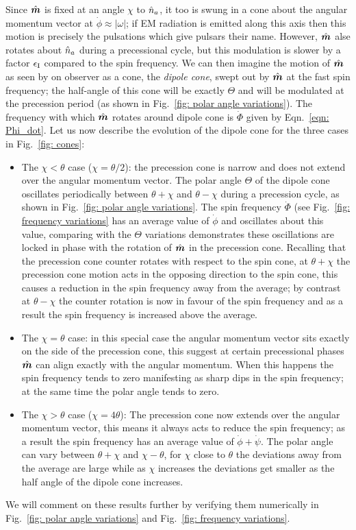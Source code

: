 \documentclass[../full_thesis/full_thesis.tex]{subfiles}
\begin{document}
Since $\hat{\boldsymbol{m}}$ is fixed at an angle $\chi$ to $\hat{n}_a$, it too is swung in a cone
about the angular momentum vector at $\dot{\phi}\approx |\omega|$; if EM
radiation is emitted along this axis then this motion is precisely the
pulsations which give pulsars their name.  However, $\hat{\boldsymbol{m}}$ alse rotates about
$\hat{n}_a$ during a precessional cycle, but this modulation is slower by a factor
$\epsilon_{\mathrm{I}}$ compared to the spin frequency. We can then imagine the motion of $\hat{\boldsymbol{m}}$
as seen by on observer as a cone, the \emph{dipole cone}, swept out by $\hat{\boldsymbol{m}}$ at
the fast spin frequency; the half-angle of this cone will be exactly $\Theta$
and will be modulated at the precession period (as shown in Fig.~\ref{fig:
polar angle variations}).  The frequency with which $\hat{\boldsymbol{m}}$ rotates around dipole
cone is $\dot{\Phi}$ given by Eqn.~\eqref{eqn: Phi_dot}. Let us now describe
the evolution of the dipole cone for the three cases in Fig.~\ref{fig: cones}:
\begin{itemize}
\item The $\chi < \theta$ case ($\chi = \theta/2$): the precession cone is
narrow and does not extend over the angular momentum vector. The polar angle
$\Theta$ of the dipole cone oscillates periodically between $\theta+\chi$ and
$\theta-\chi$ during a precession cycle, as shown in Fig.~\ref{fig: polar angle
variations}.  The spin frequency $\dot{\Phi}$ (see Fig.~\ref{fig: frequency
variations} has an average value of $\dot{\phi}$ and oscillates about this
value, comparing with the $\Theta$ variations demonstrates these oscillations
are locked in phase with the rotation of $\hat{\boldsymbol{m}}$ in the precession cone. Recalling
that the precession cone counter rotates with respect to the spin cone, at
$\theta+\chi$ the precession cone motion acts in the opposing direction to the
spin cone, this causes a reduction in the spin frequency away from the average;
by contrast at $\theta-\chi$ the counter rotation is now in favour of the spin
frequency and as a result the spin frequency is increased above the average.

\item The $\chi = \theta$ case: in this special case the angular momentum vector sits exactly
on the side of the precession cone, this suggest at certain precessional phases $\hat{\boldsymbol{m}}$ can align exactly with
the angular momentum. When this happens the spin frequency tends to zero manifesting as sharp dips in the
spin frequency; at the same time the polar angle tends to zero.

\item The $\chi > \theta$ case ($\chi = 4\theta$): The precession cone now extends over the
angular momentum vector, this means it always acts to reduce the spin
frequency; as a result the spin frequency has an average value of
$\dot{\phi} + \dot{\psi}$. The polar angle can vary between $\theta+\chi$ and
$\chi-\theta$, for $\chi$ close to $\theta$ the deviations away from the
average are large while as $\chi$ increases the deviations get smaller as
the half angle of the dipole cone increases.
\end{itemize}
We will comment on these results further by verifying them numerically in
Fig.~\ref{fig: polar angle variations} and Fig.~\ref{fig: frequency variations}.
\end{document}
